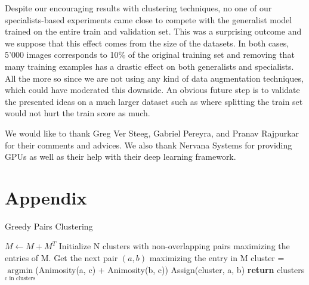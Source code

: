 \documentclass[graybox]{styles/svmult}
\begin{document}
Despite our encouraging results with clustering techniques, no one of
our specialists-based experiments came close to compete with the
generalist model trained on the entire train and validation set. This
was a surprising outcome and we suppose that this effect comes from the
size of the datasets. In both cases, 5'000 images corresponds to 10\% of
the original training set and removing that many training examples has a
drastic effect on both generalists and specialists. All the more so
since we are not using any kind of data augmentation techniques, which
could have moderated this downside. An obvious future step is to
validate the presented ideas on a much larger dataset such as
\cite{imagenet} where splitting the train set would not hurt the train
score as much.

\acknowledgement

We would like to thank Greg Ver Steeg, Gabriel Pereyra, and Pranav Rajpurkar for their comments and advices. We also thank Nervana Systems
for providing GPUs as well as their help with their deep learning
framework.

\section{Appendix}\label{appendix}


\begin{algorithm}
    \caption{Greedy Pairs Clustering}
    \label{greedy_pairs}
    \begin{algorithmic}[1] %
         
            \State $M\gets M + M^T$
            \State Initialize N clusters with non-overlapping pairs maximizing the entries of M.
                \State Get the next pair $(a, b)$ maximizing the entry in M
                \State cluster = $\underset{\text{c in clusters}}{\mathrm{argmin}}$(Animosity(a, c) + Animosity(b, c))
                \State Assign(cluster, a, b)
            \EndWhile\label{euclidendwhile}
            \State \textbf{return} clusters
        \EndProcedure
    \end{algorithmic}
\end{algorithm}




%

%


\end{document}
